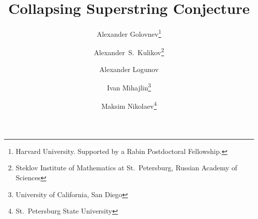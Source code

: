 \documentclass[11pt]{article}
\begin{document}
\sloppy
\begin{titlepage}
\title{Collapsing Superstring Conjecture}
\author{
Alexander Golovnev\thanks{Harvard University. Supported by a Rabin Postdoctoral Fellowship.}
\and
Alexander~S.~Kulikov\thanks{Steklov Institute of Mathematics at St.~Petersburg, Russian Academy of Sciences}
\and
Alexander Logunov\footnotemark[2]
\and
Ivan Mihajlin\thanks{University of California, San Diego}
\and 
Maksim Nikolaev\thanks{St.~Petersburg State University}
}
\maketitle
\thispagestyle{empty}



\end{titlepage}











\appendix

\end{document}
